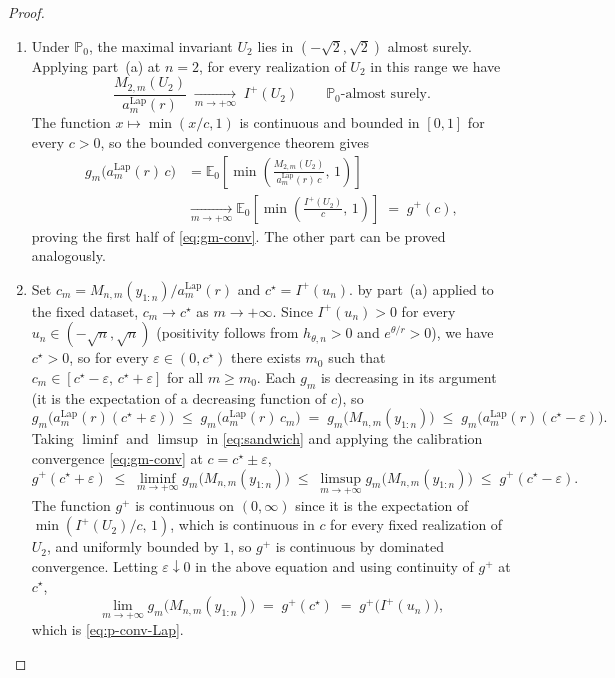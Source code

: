 \documentclass[numsec,webpdf,modern,medium,namedate]{oup-authoring-template}
\theoremstyle{thmstyleone}%
\theoremstyle{thmstyletwo}%
\theoremstyle{thmstylethree}%
\newcommand{\E}{\mathbb{E}}
\newcommand{\Lap}{\mathrm{Lap}}
\newcommand{\1}{\mathbf{1}}
\begin{document}
\begin{proof}
\begin{enumerate}
\item[(b)] Under $\mathbb{P}_0$, the maximal invariant $U_2$ lies in $(-\sqrt 2,\sqrt 2)$
almost surely. Applying part~(a) at $n=2$, for every realization of
$U_2$ in this range we have
\begin{equation}\label{eq:M2-conv-as}
  \frac{M_{2,m}(U_2)}{a_m^{\Lap}(r)}
  \;\xrightarrow[m\to+\infty]{}\; I^+(U_2)
  \qquad \mathbb{P}_0\text{-almost surely.}
\end{equation}
The function $x\mapsto\min(x/c,1)$ is continuous and bounded in
$[0,1]$ for every $c>0$, so the bounded convergence theorem gives
\begin{align*}
  g_m\!\bigl(a_m^{\Lap}(r)\,c\bigr)
  &= \E_0\!\left[\min\!\left(\frac{M_{2,m}(U_2)}{a_m^{\Lap}(r)\,c},\,1\right)\right] \\
  &\xrightarrow[m\to+\infty]{}
  \E_0\!\left[\min\!\left(\frac{I^+(U_2)}{c},\,1\right)\right]
  \;=\; g^+(c),
\end{align*}
proving the first half of \eqref{eq:gm-conv}. The other part can be proved analogously.

\item[(c)] Set $c_m = M_{n,m}(y_{1:n})/a_m^{\Lap}(r)$ and $c^\star = I^+(u_n)$.
by part~(a) applied to the fixed dataset, $c_m\to c^\star$ as
$m\to+\infty$. Since $I^+(u_n)>0$ for every $u_n\in(-\sqrt n,\sqrt n)$
(positivity follows from $h_{\theta,n}>0$ and $e^{\theta/r}>0$), we
have $c^\star>0$, so for every $\varepsilon\in(0,c^\star)$ there exists
$m_0$ such that $c_m\in[c^\star-\varepsilon,\,c^\star+\varepsilon]$
for all $m\geq m_0$. Each $g_m$ is decreasing in its argument (it is
the expectation of a decreasing function of $c$), so
\begin{equation}\label{eq:sandwich}
  g_m\!\bigl(a_m^{\Lap}(r)(c^\star+\varepsilon)\bigr)
  \;\leq\; g_m\!\bigl(a_m^{\Lap}(r)\,c_m\bigr)
  \;=\; g_m\!\bigl(M_{n,m}(y_{1:n})\bigr)
  \;\leq\; g_m\!\bigl(a_m^{\Lap}(r)(c^\star-\varepsilon)\bigr).
\end{equation}
Taking $\liminf$ and $\limsup$ in \eqref{eq:sandwich} and applying the
calibration convergence \eqref{eq:gm-conv} at $c = c^\star\pm\varepsilon$,
\[
  g^+(c^\star+\varepsilon)
  \;\leq\; \liminf_{m\to+\infty} g_m\!\bigl(M_{n,m}(y_{1:n})\bigr)
  \;\leq\; \limsup_{m\to+\infty} g_m\!\bigl(M_{n,m}(y_{1:n})\bigr)
  \;\leq\; g^+(c^\star-\varepsilon).
\]
The function $g^+$ is continuous on $(0,\infty)$ since it is the expectation of $\min(I^+(U_2)/c,\,1)$, which is continuous in $c$ for
every fixed realization of $U_2$, and uniformly bounded by $1$, so $g^+$ is continuous by dominated convergence. Letting $\varepsilon\downarrow 0$ in the above equation and using continuity of $g^+$ at $c^\star$,
\[
  \lim_{m\to+\infty} g_m\!\bigl(M_{n,m}(y_{1:n})\bigr) \;=\; g^+(c^\star)
  \;=\; g^+\!\bigl(I^+(u_n)\bigr),
\]
which is \eqref{eq:p-conv-Lap}.
\end{enumerate}
\end{proof}
\end{document}
